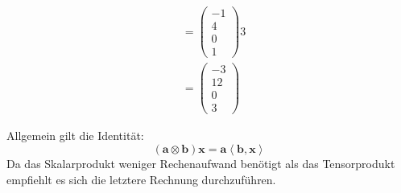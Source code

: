 {\begin{iii}
\begin{align*}
&= 
\begin{pmatrix} -1\\4\\0\\1 \end{pmatrix} 3 \\ 
&=
\begin{pmatrix} -3\\12\\0\\3 \end{pmatrix} 
\end{align*}
\end{iii}
Allgemein gilt die Identität:
$$
\left( \boldsymbol a \otimes \boldsymbol b \right) \boldsymbol x =
\boldsymbol a \left\langle \boldsymbol b, \boldsymbol x \right\rangle
$$
Da das Skalarprodukt weniger Rechenaufwand benötigt als das Tensorprodukt empfiehlt es sich
die letztere Rechnung durchzuführen.
}

{

}

